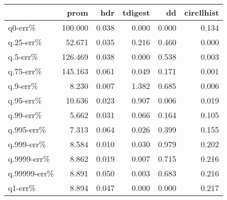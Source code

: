 \begin{tabular}{lrrrrr}
\toprule
{} &    prom &   hdr &  tdigest &    dd &  circllhist \\
\midrule
q0-err\%      & 100.000 & 0.038 &    0.000 & 0.000 &       0.134 \\
q.25-err\%    &  52.671 & 0.035 &    0.216 & 0.460 &       0.000 \\
q.5-err\%     & 126.469 & 0.038 &    0.000 & 0.538 &       0.003 \\
q.75-err\%    & 145.163 & 0.061 &    0.049 & 0.171 &       0.001 \\
q.9-err\%     &   8.230 & 0.007 &    1.382 & 0.685 &       0.006 \\
q.95-err\%    &  10.636 & 0.023 &    0.907 & 0.006 &       0.019 \\
q.99-err\%    &   5.662 & 0.031 &    0.066 & 0.164 &       0.105 \\
q.995-err\%   &   7.313 & 0.064 &    0.026 & 0.399 &       0.155 \\
q.999-err\%   &   8.584 & 0.010 &    0.030 & 0.979 &       0.202 \\
q.9999-err\%  &   8.862 & 0.019 &    0.007 & 0.715 &       0.216 \\
q.99999-err\% &   8.891 & 0.050 &    0.003 & 0.683 &       0.216 \\
q1-err\%      &   8.894 & 0.047 &    0.000 & 0.000 &       0.217 \\
\bottomrule
\end{tabular}
